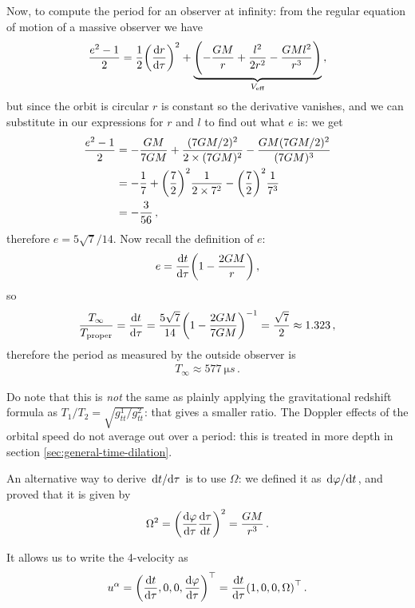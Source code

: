 \documentclass[main.tex]{subfiles}
\begin{document}
Now, to compute the period for an observer at infinity: from the regular equation of motion of a massive observer we have 
%
\begin{align}
  \frac{e^2-1}{2} = \frac{1}{2} \qty(\dv{r}{\tau })^2+ \underbrace{\qty(-\frac{GM}{r} + \frac{l^2}{2r^2} - \frac{GMl^2}{r^3})}_{V _{\text{eff}}}
\,,
\end{align}
%
but since the orbit is circular \(r\) is constant so the derivative vanishes, and we can substitute in our expressions for \(r\) and \(l\) to find out what \(e\) is: we get 
%
\begin{align}
  \frac{e^2-1}{2} &= - \frac{GM}{7GM} + \frac{(7GM/2)^2}{2\times (7GM)^2} - \frac{GM (7GM/2)^2}{(7GM)^3}  \\
&= - \frac{1}{7}+ \qty(\frac{7}{2})^2 \frac{1}{2\times 7^2} - \qty(\frac{7}{2})^2 \frac{1}{7^3}  \\
&= -\frac{3}{56}
\,,
\end{align}
%
therefore \(e = 5 \sqrt{7} / 14\). Now recall the definition of \(e\): 
%
\begin{align}
  e = \dv{t}{\tau } \qty(1 - \frac{2GM}{r}) 
\,,
\end{align}
%
so 
%
\begin{align}
  \frac{T_{ \infty }}{T _{\text{proper}}} = 
  \dv{t}{\tau } = \frac{5 \sqrt{7}}{14} \qty(1 - \frac{2GM}{7GM})^{-1} = \frac{\sqrt{7}}{2} \approx 1.323 
\,,
\end{align}
%
therefore the period as measured by the outside observer is 
%
\begin{align}
  T_{ \infty } \approx \SI{577}{\micro s}
\,.
\end{align}
%

Do note that this is \emph{not} the same as plainly applying the gravitational redshift formula as \(T_1 / T_2 = \sqrt{ g_{tt}^{1}/ g_{tt}^{2}}\): that gives a smaller ratio. The Doppler effects of the orbital speed do not average out over a period: this is treated in more depth in section \ref{sec:general-time-dilation}. 

An alternative way to derive \(\dv*{t}{\tau }\) is to use \(\Omega \): we defined it as \(\dv*{\varphi }{t}\), and proved that it is given by 
%
\begin{align}
  \Omega^2 = \qty(\dv{\varphi }{\tau } \dv{\tau }{t})^2
  = \frac{GM}{r^3}
\,.
\end{align}

It allows us to write the 4-velocity as 
%
\begin{align}
  u^{\alpha } = \qty(\dv{t}{\tau }, 0, 0, \dv{\varphi}{\tau })^{\top} = \dv{t}{\tau } \qty(1, 0, 0, \Omega )^{\top}
\,.
\end{align}
\end{document}
